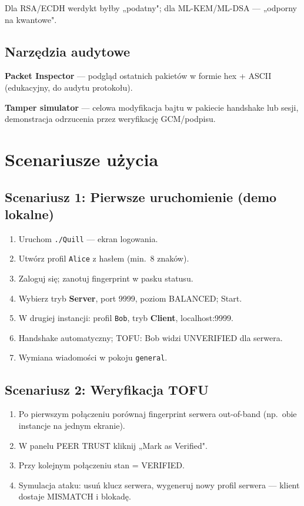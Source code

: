 \documentclass[12pt,a4paper]{article}
\begin{document}
Dla RSA/ECDH werdykt byłby „podatny"; dla ML-KEM/ML-DSA --- „odporny na kwantowe".

\subsection{Narzędzia audytowe}

\textbf{Packet Inspector} --- podgląd ostatnich pakietów w formie hex + ASCII (edukacyjny, do audytu protokołu).

\textbf{Tamper simulator} --- celowa modyfikacja bajtu w pakiecie handshake lub sesji, demonstracja odrzucenia przez weryfikację GCM/podpisu.

\section{Scenariusze użycia}

\subsection{Scenariusz 1: Pierwsze uruchomienie (demo lokalne)}

\begin{enumerate}
    \item Uruchom \texttt{./Quill} --- ekran logowania.
    \item Utwórz profil \texttt{Alice} z hasłem (min.\ 8 znaków).
    \item Zaloguj się; zanotuj fingerprint w pasku statusu.
    \item Wybierz tryb \textbf{Server}, port 9999, poziom BALANCED; Start.
    \item W drugiej instancji: profil \texttt{Bob}, tryb \textbf{Client}, localhost:9999.
    \item Handshake automatyczny; TOFU: Bob widzi UNVERIFIED dla serwera.
    \item Wymiana wiadomości w pokoju \texttt{general}.
\end{enumerate}

\subsection{Scenariusz 2: Weryfikacja TOFU}

\begin{enumerate}
    \item Po pierwszym połączeniu porównaj fingerprint serwera out-of-band (np.\ obie instancje na jednym ekranie).
    \item W panelu PEER TRUST kliknij „Mark as Verified".
    \item Przy kolejnym połączeniu stan = VERIFIED.
    \item Symulacja ataku: usuń klucz serwera, wygeneruj nowy profil serwera --- klient dostaje MISMATCH i blokadę.
\end{enumerate}
\end{document}
